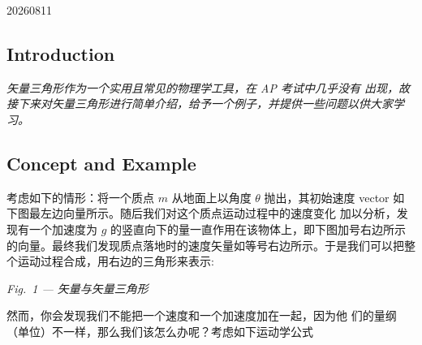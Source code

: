 

\begin{problem}{20260811}

    
\subsection*{Introduction}
\emph{矢量三角形作为一个实用且常见的物理学工具，在 AP 考试中几乎没有 出现，故接下来对矢量三角形进行简单介绍，给予一个例子，并提供一些问题以供大家学习。}

\subsection*{Concept and Example}

考虑如下的情形：将一个质点 $m$ 从地面上以角度 $\theta$ 抛出，其初始速度 vector 如下图最左边向量所示。随后我们对这个质点运动过程中的速度变化 加以分析，发现有一个加速度为 $g$ 的竖直向下的量一直作用在该物体上，即下图加号右边所示的向量。最终我们发现质点落地时的速度矢量如等号右边所示。于是我们可以把整个运动过程合成，用右边的三角形来表示:

\begin{center}
    \begin{minipage}{0.85\textwidth}
    \centering
    \par\smallskip
    \textit{Fig.~1 --- 矢量与矢量三角形}
    \end{minipage}
\end{center}

然而，你会发现我们不能把一个速度和一个加速度加在一起，因为他 们的量纲（单位）不一样，那么我们该怎么办呢？考虑如下运动学公式


\end{problem}
